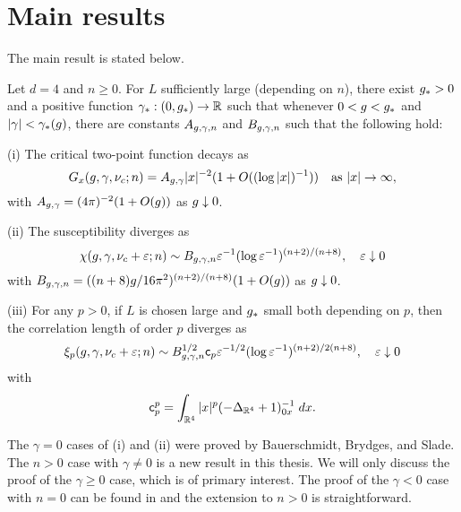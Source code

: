 \section{Main results}

The main result is stated below.

\begin{theorem} \label{thm:suscept}
  Let $d = 4$ and $n \ge 0$. For $L$ sufficiently large (depending on $n$),
  there exist $g_* > 0$
  and a positive function $\gamma_* : (0, g_*) \rightarrow {\mathbb R}$
  such that whenever $0 < g < g_*$ and $|\gamma| < \gamma_*(g)$,
  there are constants $A_{g,\gamma,n}$ and $B_{g,\gamma,n}$ such that the following hold:

  \smallskip\noindent
  (i)
  The critical two-point function decays as
  \begin{equation}
    G_x(g,\gamma,\nu_c; n)
        =
    A_{g,\gamma} |x|^{-2} (1 + O((\log |x|)^{-1}))
        \quad
    \text{as $|x|\rightarrow\infty$},
  \end{equation}
  with $A_{g,\gamma} = (4 \pi)^{-2} (1 + O(g))$ as $g \downarrow 0$.

  \smallskip\noindent
  (ii)
  The susceptibility diverges as
  \begin{equation} \label{e:chieps-asympt}
    \chi(g, \gamma, \nu_c + \varepsilon; n)
      \sim B_{g,\gamma,n} \varepsilon^{-1} (\log \varepsilon^{-1})^{(n+2)/(n+8)},
    \quad \varepsilon\downarrow 0
  \end{equation}
  with $B_{g,\gamma,n} = ((n + 8) g / 16\pi^2)^{(n+2)/(n+8)} (1 + O(g))$
  as $g \downarrow 0$.

  \smallskip\noindent
  (iii) For any $p >0$, if $L$ is chosen large and $g_*$ small both depending on $p$,
  then the correlation length of order $p$ diverges as
  \begin{equation} \label{e:xieps-asympt}
    \xi_p(g, \gamma, \nu_c + \varepsilon; n)
     \sim B_{g,\gamma,n}^{1/2} {\sf c}_p \varepsilon^{-1/2} (\log \varepsilon^{-1})^{(n+2)/2(n+8)},
    \quad \varepsilon\downarrow 0
  \end{equation}
  with
  \begin{equation}
  {\sf c}_p^p = \int_{{\mathbb R}^4} |x|^p (-\Delta_{{\mathbb R}^4} + 1)^{-1}_{0x} \; dx.
  \end{equation}
\end{theorem}

The $\gamma = 0$ cases of (i) and (ii) were proved by Bauerschmidt, Brydges, and
Slade. The $n > 0$ case with $\gamma \ne 0$ is a new result in this thesis. We
will only discuss the proof of the $\gamma \ge 0$ case, which is of primary
interest. The proof of the $\gamma < 0$ case with $n = 0$ can be found in
\cite{BSW-saw-sa} and the extension to $n > 0$ is straightforward.

